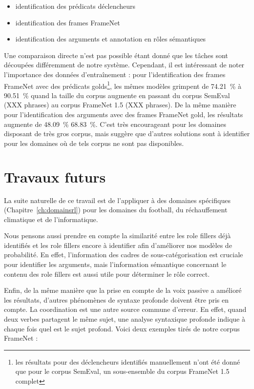 \begin{itemize}
    \item identification des prédicats déclencheurs
    \item identification des frames FrameNet
    \item identification des arguments et annotation en rôles sémantiques 
\end{itemize}

Une comparaison directe n'est pas possible étant donné que les tâches sont
découpées différemment de notre système. Cependant, il est intéressant de noter
l'importance des données d'entraînement : pour l'identification des frames
FrameNet avec des prédicats golds\footnote{les résultats pour des déclencheurs
identifiés manuellement n'ont été donné que pour le corpus SemEval, un
sous-ensemble du corpus FrameNet 1.5 complet}, les mêmes modèles grimpent de
74.21~\% à 90.51~\% quand la taille du corpus augmente en passant du corpus
SemEval (XXX phrases) au corpus FrameNet 1.5 (XXX phrases). De la même manière
pour l'identification des arguments avec des frames FrameNet gold, les
résultats augmente de 48.09~\% 68.83~\%. C'est très encourageant pour les
domaines disposant de très gros corpus, mais suggère que d'autres solutions
sont à identifier pour les domaines où de tels corpus ne sont pas disponibles.

\section{Travaux futurs}

La suite naturelle de ce travail est de l'appliquer à des domaines spécifiques
(Chapitre~\ref{ch:domainsrl}) pour les domaines du football, du réchauffement
climatique et de l'informatique.

Nous pensons aussi prendre en compte la similarité entre les role fillers déjà
identifiés et les role fillers encore à identifier afin d'améliorer nos modèles
de probabilité. En effet, l'information des cadres de sous-catégorisation est
cruciale pour identifier les arguments, mais l'information sémantique
concernant le contenu des role fillers est aussi utile pour déterminer le rôle
correct.

Enfin, de la même manière que la prise en compte de la voix passive a amélioré
les résultats, d'autres phénomènes de syntaxe profonde doivent être pris en
compte. La coordination est une autre source commune d'erreur. En effet, quand
deux verbes partagent le même sujet, une analyse syntaxique profonde indique à
chaque fois quel est le sujet profond. Voici deux exemples tirés de notre
corpus FrameNet :

